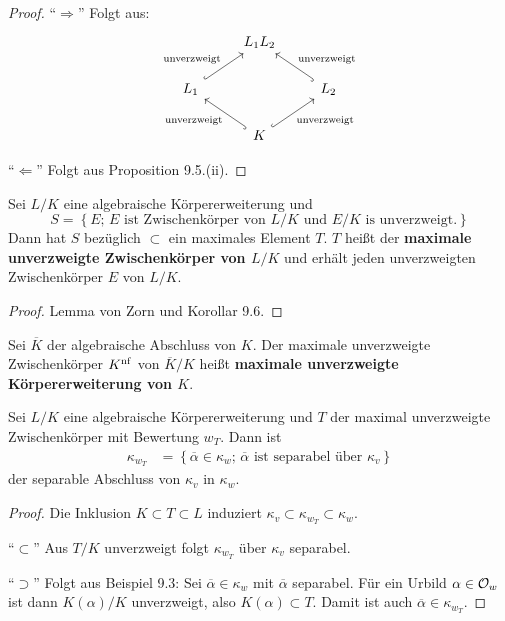 \begin{proof}
	\enquote{$\Rightarrow$} Folgt aus:
	\[\begin{tikzcd}
	& L_1 L_2 & \\
	L_1 
	\arrow[hook]{ur}{\text{unverzweigt}}
	& & L_2 
	\arrow[hook, swap]{ul}{\text{unverzweigt}}
	\\
	& K 
	\arrow[hook, swap]{ur}{\text{unverzweigt}}
	\arrow[hook]{ul}{\text{unverzweigt}}
	&
	\end{tikzcd}
	\]
	
	\enquote{$\Leftarrow$} Folgt aus Proposition 9.5.(ii).
\end{proof}


\begin{Bemdef}
	Sei $L/K$ eine algebraische Körpererweiterung und
	\[ S = \left\{
	E; \, E \text{ ist Zwischenkörper von $L/K$ und $E/K$ is unverzweigt}.
	\right\}
	\]
	Dann hat $S$ bezüglich $\subset$ ein maximales Element $T$. 
	$T$ heißt der \textbf{maximale unverzweigte Zwischenkörper von $L/K$} und erhält jeden unverzweigten  Zwischenkörper $E$ von $L/K$.
\end{Bemdef}

\begin{proof}
	Lemma von Zorn und Korollar 9.6.
\end{proof}

\begin{defi}
	Sei $\overline{K}$ der algebraische Abschluss von $K$. Der maximale unverzweigte Zwischenkörper $K^{\operatorname{nf}}$ von $\overline{K} /K$ heißt \textbf{maximale unverzweigte Körpererweiterung von $K$}.
\end{defi}

\begin{Prop}
	Sei $L/K$ eine algebraische Körpererweiterung und $T$ der maximal unverzweigte Zwischenkörper mit Bewertung $w_T$. Dann ist
	\begin{align*}
	\kappa_{w_T}
	&= \left\{
	\overline{\alpha} \in \kappa_w; \, \text{$\overline{\alpha}$ ist separabel über $\kappa_v$}
	\right\}
	\end{align*}
	der separable Abschluss von $\kappa_v$ in $\kappa_w$.
\end{Prop}


\begin{proof}
	Die Inklusion $K\subset T \subset L$ induziert $\kappa_v \subset \kappa_{w_T} \subset \kappa_w$.
	
	\bigskip \enquote{$\subset$} Aus $T/K$ unverzweigt folgt $\kappa_{w_T}$ über $\kappa_v$ separabel.
	
	\bigskip \enquote{$\supset$} Folgt aus Beispiel 9.3: Sei $\overline{\alpha} \in \kappa_w$ mit $\overline{\alpha}$ separabel.
	Für ein Urbild $\alpha \in \mathcal{O}_w$ ist dann $K(\alpha)/K$  unverzweigt, also $K(\alpha) \subset T$.
	Damit ist auch $\overline{\alpha} \in \kappa_{w_T}$.
\end{proof}

